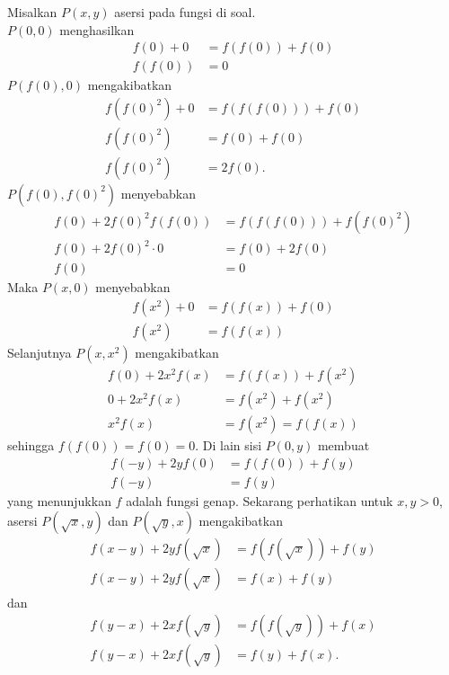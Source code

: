 
\begin{solusi}
    Misalkan $P(x,y)$ asersi pada fungsi di soal.\\
    $P(0,0)$ menghasilkan
    \begin{align*}
        f(0)+0 &= f(f(0))+f(0)\\
        f(f(0)) &= 0
    \end{align*}
    $P(f(0),0)$ mengakibatkan
    \begin{align*}
        f(f(0)^2)+0 &= f(f(f(0))) + f(0)\\
        f(f(0)^2) &= f(0) + f(0)\\
        f(f(0)^2) &=2f(0).
    \end{align*}
    $P(f(0),f(0)^2)$ menyebabkan
    \begin{align*}
        f(0)+2f(0)^2f(f(0)) &= f(f(f(0)))+f(f(0)^2)\\
        f(0)+2f(0)^2 \cdot 0 &= f(0)+2f(0)\\
        f(0) &= 0
    \end{align*}
    Maka $P(x,0)$ menyebabkan
    \begin{align*}
        f(x^2)+0 &= f(f(x)) + f(0)\\
        f(x^2) &= f(f(x))
    \end{align*}
    Selanjutnya $P(x,x^2)$ mengakibatkan
    \begin{align*}
        f(0) + 2x^2f(x) &= f(f(x))+f(x^2)\\
        0+2x^2f(x) &= f(x^2)+f(x^2)\\
        x^2f(x) &= f(x^2) = f(f(x))
    \end{align*}
    sehingga $f(f(0))=f(0)=0$.
    Di lain sisi $P(0,y)$ membuat
    \begin{align*}
        f(-y)+2yf(0) &= f(f(0)) + f(y)\\
        f(-y) &= f(y)
    \end{align*}
    yang menunjukkan $f$ adalah fungsi genap. Sekarang perhatikan untuk $x,y > 0$, asersi $P(\sqrt{x}, y)$ dan $P(\sqrt{y},x)$ mengakibatkan
    \begin{align*}
        f(x-y) + 2yf(\sqrt{x}) &= f(f(\sqrt{x}))+f(y)\\
        f(x-y) + 2yf(\sqrt{x}) &= f(x)+f(y)
    \end{align*}
    dan
    \begin{align*}
        f(y-x) + 2xf(\sqrt{y}) &= f(f(\sqrt{y}))+f(x)\\
        f(y-x) + 2xf(\sqrt{y}) &= f(y)+f(x).
    \end{align*}

\end{solusi}
